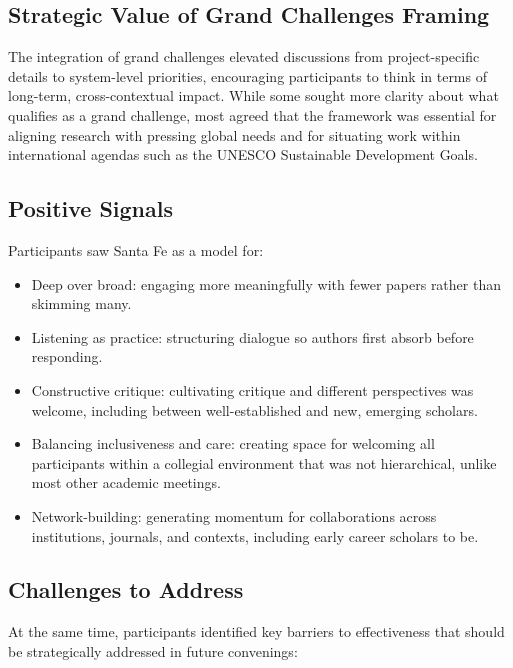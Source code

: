 \documentclass[
  letterpaper,
  DIV=11,
  numbers=noendperiod]{scrartcl}
\begin{document}
\subsection{Strategic Value of Grand Challenges
Framing}\label{strategic-value-of-grand-challenges-framing}

The integration of grand challenges elevated discussions from
project-specific details to system-level priorities, encouraging
participants to think in terms of long-term, cross-contextual impact.
While some sought more clarity about what qualifies as a grand
challenge, most agreed that the framework was essential for aligning
research with pressing global needs and for situating work within
international agendas such as the UNESCO Sustainable Development Goals.

\subsection{Positive Signals}\label{positive-signals}

Participants saw Santa Fe as a model for:

\begin{itemize}
\item
  Deep over broad: engaging more meaningfully with fewer papers rather
  than skimming many.
\item
  Listening as practice: structuring dialogue so authors first absorb
  before responding.
\item
  Constructive critique: cultivating critique and different perspectives
  was welcome, including between well-established and new, emerging
  scholars.
\item
  Balancing inclusiveness and care: creating space for welcoming all
  participants within a collegial environment that was not hierarchical,
  unlike most other academic meetings.
\item
  Network-building: generating momentum for collaborations across
  institutions, journals, and contexts, including early career scholars
  to be.
\end{itemize}

\subsection{Challenges to Address}\label{challenges-to-address}

At the same time, participants identified key barriers to effectiveness
that should be strategically addressed in future convenings:
\end{document}
